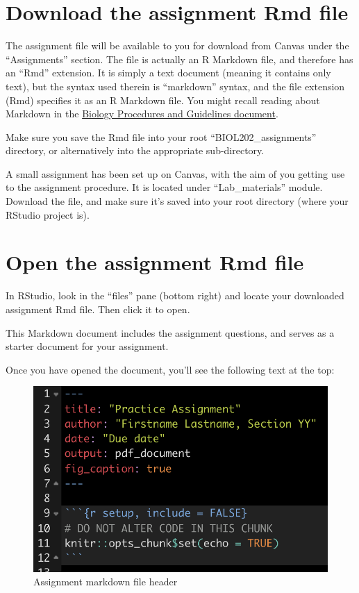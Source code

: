 \documentclass[
]{book}
\begin{document}
\section{Download the assignment Rmd file}\label{download_assign_rmd}

The assignment file will be available to you for download from Canvas under the ``Assignments'' section. The file is actually an R Markdown file, and therefore has an ``Rmd'' extension. It is simply a text document (meaning it contains only text), but the syntax used therein is ``markdown'' syntax, and the file extension (Rmd) specifies it as an R Markdown file. You might recall reading about Markdown in the \href{https://ubco-biology.github.io/Procedures-and-Guidelines/markdown-1.html}{Biology Procedures and Guidelines document}.

Make sure you save the Rmd file into your root ``BIOL202\_assignments'' directory, or alternatively into the appropriate sub-directory.

A small assignment has been set up on Canvas, with the aim of you getting use to the assignment procedure. It is located under ``Lab\_materials'' module. Download the file, and make sure it's saved into your root directory (where your RStudio project is).

\section{Open the assignment Rmd file}\label{open_rmd_file}

In RStudio, look in the ``files'' pane (bottom right) and locate your downloaded assignment Rmd file. Then click it to open.

This Markdown document includes the assignment questions, and serves as a starter document for your assignment.

Once you have opened the document, you'll see the following text at the top:

\begin{figure}
\includegraphics[width=11.67in]{./more/assign_header} \caption{Assignment markdown file header}\label{fig:unnamed-chunk-11}
\end{figure}
\end{document}
